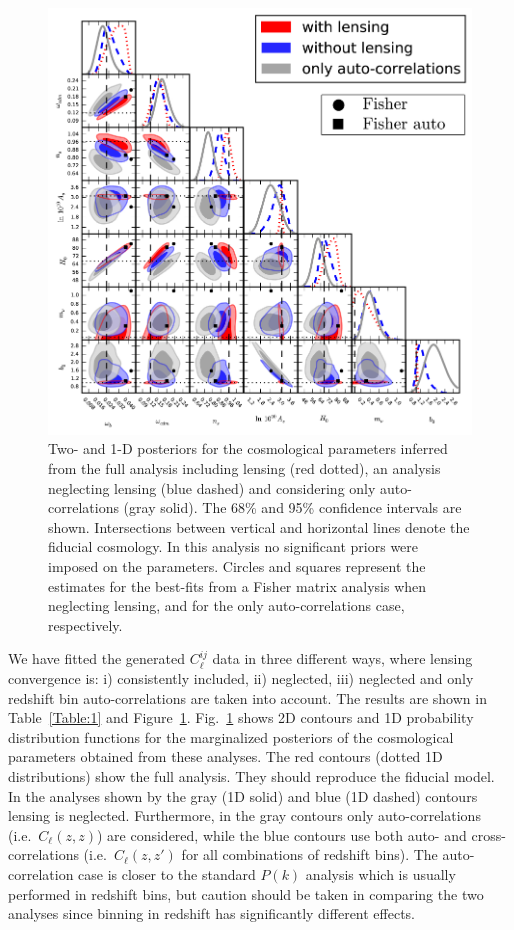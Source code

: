 \begin{figure}[bthp]
  \centering
  \includegraphics[scale=1.2]{figures/chapter-mnu/triangle_figure_MCDM_bias_w_legend.pdf}
  \caption{Two- and 1-D posteriors for the cosmological parameters inferred from the full analysis including lensing (red dotted), an analysis neglecting lensing (blue dashed) and considering only auto-correlations (gray solid).
    The 68\% and 95\% confidence intervals are shown.
    Intersections between vertical and horizontal lines denote the fiducial cosmology.
   In this analysis no significant priors were imposed on the parameters.  Circles and squares represent the estimates for the best-fits from a Fisher matrix analysis when neglecting lensing, and for the only auto-correlations case, respectively.
  }
  \label{fig:mcmc}
\end{figure}

We have  fitted the generated $C_\ell^{ij}$ data in three different ways,  where lensing convergence is: i) consistently included, ii) neglected, iii) neglected and only redshift bin auto-correlations are taken into account. The results are shown in Table~\ref{Table:1} and Figure~\ref{fig:mcmc}. Fig.~\ref{fig:mcmc} shows 2D contours and 1D probability distribution functions for the marginalized posteriors of the cosmological parameters obtained from these analyses. The red contours (dotted 1D distributions) show the full analysis. They should reproduce the fiducial model. In the analyses shown by the gray (1D solid) and blue (1D dashed) contours lensing is neglected. Furthermore, in the gray  contours only auto-correlations (i.e.\ $C_\ell(z,z)$) are considered, while the blue contours use both auto- and cross-correlations (i.e.\ $C_\ell(z,z')$ for all combinations of redshift bins).
The auto-correlation case is closer to the standard $P(k)$ analysis which is usually performed in redshift bins, but caution should be taken in comparing the two analyses since binning in redshift has significantly different effects.

